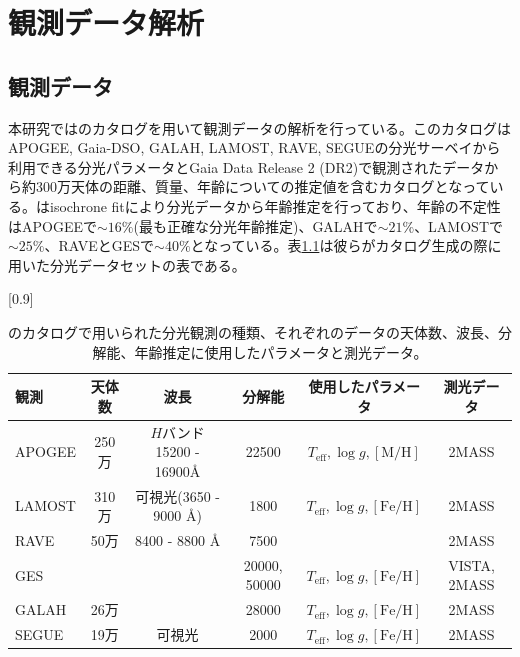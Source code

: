 \chapter{観測データ解析}



\section{観測データ}
本研究では\cite{SD18}のカタログを用いて観測データの解析を行っている。このカタログはAPOGEE, Gaia-DSO, GALAH, LAMOST, RAVE, SEGUEの分光サーベイから利用できる分光パラメータとGaia Data Release 2 (DR2)で観測されたデータから約300万天体の距離、質量、年齢についての推定値を含むカタログとなっている。\cite{SD18}はisochrone fitにより分光データから年齢推定を行っており、年齢の不定性はAPOGEEで$\sim 16 \%$(最も正確な分光年齢推定)、GALAHで$\sim 21\%$、LAMOSTで$\sim 25\%$、RAVEとGESで$\sim 40\%$となっている。表\ref{spec_dataset}は彼らがカタログ生成の際に用いた分光データセットの表である。


\begin{table}[htb]
\small
\begin{center}
\scalebox{0.87}[0.9]{
\begin{tabular}{|l||c|c|c|c|c|} \hline
    観測 & 天体数 & 波長 & 分解能 & 使用したパラメータ & 測光データ\\ \hline
    APOGEE & 250万 & $H$バンド 15200 - 16900\AA & 22500 & $T_{\mathrm{eff}},\log g, \mathrm{[M/H]}$ & 2MASS\\
    LAMOST & 310万 & 可視光(3650 - 9000 \AA) & 1800 & $T_{\mathrm{eff}},\log g, \mathrm{[Fe/H]}$ & 2MASS \\
    RAVE & 50万 & 8400 - 8800 \AA & 7500 &   & 2MASS\\
    GES & & & 20000, 50000 & $T_{\mathrm{eff}},\log g, \mathrm{[Fe/H]}$ & VISTA, 2MASS\\
    GALAH & 26万 &  & 28000 & $T_{\mathrm{eff}},\log g, \mathrm{[Fe/H]}$ & 2MASS\\
    SEGUE & 19万 & 可視光　& 2000 & $T_{\mathrm{eff}},\log g, \mathrm{[Fe/H]}$ & 2MASS\\ \hline
\end{tabular}
}
\caption{\cite{SD18}のカタログで用いられた分光観測の種類、それぞれのデータの天体数、波長、分解能、年齢推定に使用したパラメータと測光データ。}
\end{center} \label{spec_dataset}
\end{table}

